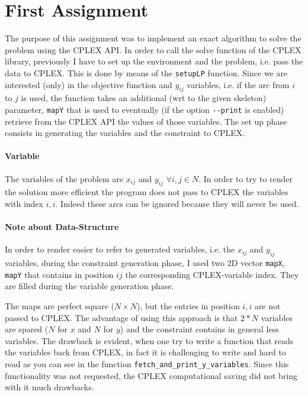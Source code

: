 \section{First Assignment}
The purpose of this assignment was to implement an exact algorithm to solve the problem using the CPLEX API.
In order to call the solve function of the CPLEX library, previously I have to set up the environment
and the problem, i.e. pass the data to CPLEX. This is done by means of the \verb|setupLP| function.
Since we are interested (only) in the objective function and $y_{ij}$ variables, i.e. if the arc from $i$
to $j$ is used, the function takes
an additional (wrt to the given skeleton) parameter,  \verb|mapY| that is used to eventually (if the option \verb|--print| is enabled) 
retrieve from the CPLEX API the values of those variables.
The set up phase consists in generating the variables and the constraint to CPLEX.

\paragraph{Variable}
The variables of the problem are $x_{ij}$ and $y_{ij}$ $\forall i,j \in N$.
In order to try to render the solution more efficient the program does not pass
to CPLEX the variables with index $i,i$. Indeed these arcs can be ignored because
they will never be used.


\paragraph{Note about Data-Structure} In order to render easier to refer to generated variables, i.e. the $x_{ij}$ and $y_{ij}$ variables,
during the constraint generation phase, I used two 2D vector \verb|mapX|, \verb|mapY| that contains in position $ij$ 
the corresponding CPLEX-variable index. They are filled during the variable generation phase.

The maps are perfect square ($N\times N$), but the entries in position $i,i$
are not passed to CPLEX.
The advantage of using this approach is that $2*N$ variables are spared ($N$ for $x$ and $N$ for $y$) and the constraint
contains in general less variables.
The drawback is evident, when one try to write a function that reads the variables back from CPLEX, 
in fact it is challenging to write and hard to read   as you 
can see in the function \verb|fetch_and_print_y_variables|.
Since this functionality was not requested, the CPLEX computational saving did not bring with it much drawbacks.



